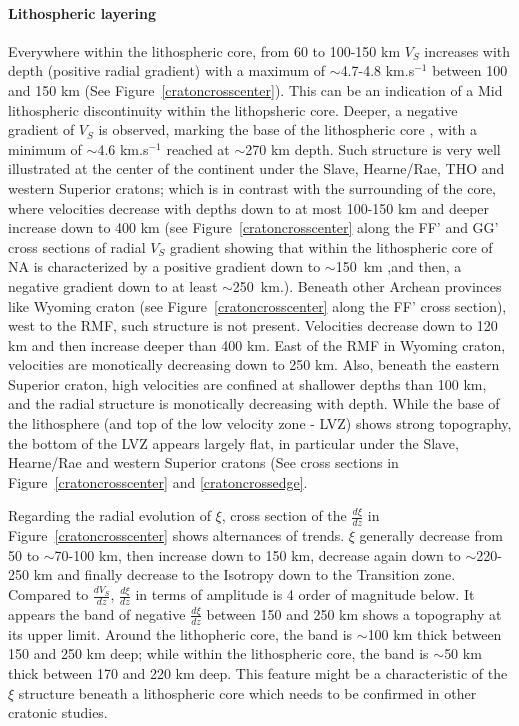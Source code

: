 \documentclass[12pt]{article}
\begin{document}
		\paragraph{Lithospheric layering}
		Everywhere within the lithospheric core, from 60 to 100-150 km $V_S$ increases with depth (positive radial gradient) with a maximum of $\sim$4.7-4.8 km.s$^{-1}$ between 100 and 150 km (See Figure~\ref{cratoncrosscenter}). This can be an indication of a Mid lithospheric discontinuity within the lithopsheric core. 
		Deeper, a negative gradient of $V_S$ is observed, marking the base of the lithospheric core \citep{eaton2009elusive}, with a minimum of $\sim$4.6 km.s$^{-1}$ reached at $\sim$270 km depth. 
		Such structure is very well illustrated at the center of the continent under the Slave, Hearne/Rae, THO and western Superior cratons; which is in contrast with the surrounding of the core, where velocities decrease with depths down to at most 100-150 km and deeper increase down to 400 km (see Figure~\ref{cratoncrosscenter} along the FF' and GG' cross sections of radial $V_S$ gradient showing that within the lithospheric core of NA is characterized by a positive gradient down to $\sim$150~km ,and then, a negative gradient down to at least $\sim$250~km.). 
		Beneath other Archean provinces like Wyoming craton (see Figure~\ref{cratoncrosscenter} along the FF' cross section), west to the RMF, such structure is not present. 
		Velocities decrease down to 120 km and then increase deeper than 400 km. 
		East of the RMF in Wyoming craton, velocities are monotically decreasing down to 250 km. 
		Also, beneath the eastern Superior craton, high velocities are confined at shallower depths than 100 km, and the radial structure is monotically decreasing with depth. 
		While the base of the lithosphere (and top of the low velocity zone - LVZ) shows strong topography, the bottom of the LVZ appears largely flat, in particular under the Slave, Hearne/Rae and western Superior cratons (See cross sections in Figure~\ref{cratoncrosscenter} and \ref{cratoncrossedge}.

		Regarding the radial evolution of $\xi$, cross section of the $\frac{d\xi}{dz}$ in Figure~\ref{cratoncrosscenter} shows alternances of trends.
		$\xi$ generally decrease from 50 to $\sim$70-100 km, then increase down to 150 km, decrease again down to $\sim$220-250 km and finally decrease to the Isotropy down to the Transition zone. Compared to $\frac{dV_S}{dz}$, $\frac{d\xi}{dz}$ in terms of amplitude is 4 order of magnitude below. It appears the band of negative $\frac{d\xi}{dz}$ between 150 and 250 km shows a topography at its upper limit. Around the lithopheric core, the band is $\sim$100 km thick between 150 and 250 km deep; while within the lithospheric core, the band is $\sim$50 km thick between 170 and 220 km deep. This feature might be a characteristic of the $\xi$ structure beneath a lithospheric core which needs to be confirmed in other cratonic studies.
\end{document}
